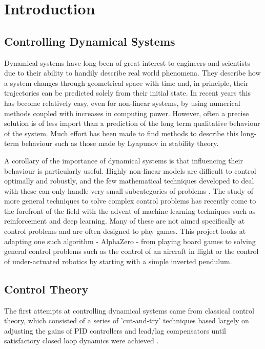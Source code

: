\documentclass[../main.tex]{subfiles}
\begin{document}
\chapter{Introduction}

\section{Controlling Dynamical Systems}
Dynamical systems have long been of great interest to engineers and scientists due to their ability to handily describe real world phenomena. They describe how a system changes through geometrical space with time and, in principle, their trajectories can be predicted solely from their initial state. In recent years this has become relatively easy, even for non-linear systems, by using numerical methods coupled with increases in computing power. However, often a precise solution is of less import than a prediction of the long term qualitative behaviour of the system. Much effort has been made to find methods to describe this long-term behaviour such as those made by Lyapunov in stability theory. 

A corollary of the importance of dynamical systems is that influencing their behaviour is particularly useful. Highly non-linear models are difficult to control optimally and robustly, and the few mathematical techniques developed to deal with these can only handle very small subcategories of problems \cite{4f2, 4f3}. The study of more general techniques to solve complex control problems has recently come to the forefront of the field with the advent of machine learning techniques such as reinforcement and deep learning. Many of these are not aimed specifically at control problems and are often designed to play games. This project looks at adapting one such algorithm - AlphaZero - from playing board games to solving general control problems such as the control of an aircraft in flight or the control of under-actuated robotics by starting with a simple inverted pendulum.

\section{Control Theory}
The first attempts at controlling dynamical systems came from classical control theory, which consisted of a series of 'cut-and-try' techniques based largely on adjusting the gains of PID controllers and lead/lag compensators until satisfactory closed loop dynamics were achieved \cite{History}.
\end{document}
